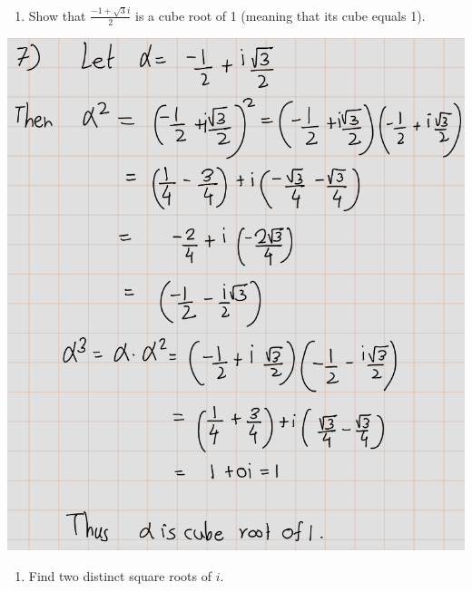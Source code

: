 \documentclass[
]{book}
\providecommand{\tightlist}{%
  \setlength{\itemsep}{0pt}\setlength{\parskip}{0pt}}
\theoremstyle{definition}
\theoremstyle{definition}
\theoremstyle{definition}
\theoremstyle{definition}
\theoremstyle{remark}
\begin{document}
\begin{enumerate}
\def\labelenumi{\arabic{enumi}.}
\setcounter{enumi}{6}
\tightlist
\item
  Show that \(\frac{-1 + \sqrt{3}i}{2}\) is a cube root of 1 (meaning that its cube equals 1).
\end{enumerate}

\includegraphics[width=10.65in]{fig/Ex1A/Ex7}

\begin{enumerate}
\def\labelenumi{\arabic{enumi}.}
\setcounter{enumi}{7}
\tightlist
\item
  Find two distinct square roots of \(i\).
\end{enumerate}
\end{document}
